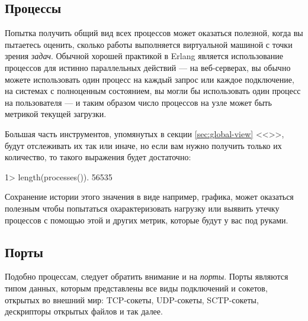 \documentclass[11pt, oneside]{book}   	%
\newcommand\NamedRef[1]{\ref{#1} <<\nameref{#1}>>}
\begin{document}
\subsection{Процессы}
\label{subsec:global-procs}

Попытка получить общий вид всех процессов может оказаться полезной, когда вы пытаетесь оценить, сколько работы выполняется виртуальной машиной с точки зрения \emph{задач}. Обычной хорошей практикой в Erlang является использование процессов для истинно параллельных действий --- на веб-серверах, вы обычно можете использовать один процесс на каждый запрос или каждое подключение, на системах с полноценным состоянием, вы могли бы использовать один процесс на пользователя --- и таким образом число процессов на узле может быть метрикой текущей загрузки.

Большая часть инструментов, упомянутых в секции \NamedRef{sec:global-view}, будут отслеживать их так или иначе, но если вам нужно получить только их количество, то такого выражения будет достаточно:

\begin{VerbatimEshell}
1> length(processes()).
56535
\end{VerbatimEshell}

Сохранение истории этого значения в виде например, графика, может оказаться полезным чтобы попытаться охарактеризовать нагрузку или выявить утечку процессов с помощью этой и других метрик, которые будут у вас под руками.


\subsection{Порты}
\label{subsec:global-ports}

Подобно процессам, следует обратить внимание и на \emph{порты}. Порты являются типом данных, которым представлены все виды подключений и сокетов, открытых во внешний мир: TCP-сокеты, UDP-сокеты, SCTP-сокеты, дескрипторы открытых файлов и так далее.
\end{document}
